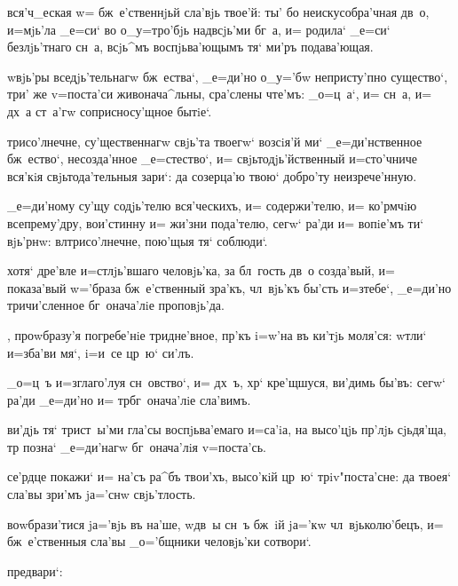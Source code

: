 {  вся'ч_еская w= 
бж~е'ственнjьй сла'вjь твое'й: ты' бо неискусобра'чная 
дв~о, и=мjь'ла _е=си` во о_у=тро'бjь над\ъ всjь'ми бг~а, 
и= родила` _е=си` безлjь'тнаго сн~а, всjь^мъ 
воспjьва'ющымъ тя` ми'ръ подава'ющая.

 w\т вjь'ры вседjь'тельнагw бж~ества`, 
_е=ди'но о_у='бw непристу'пно существо`, три' же 
v=поста'си живонача^льны, сра'слены чте'мъ: _о=ц~а`, и= 
сн~а, и= дх~а ст~а'гw соприсносу'щное бытiе`.

 трисо'лнечне, су'щественнагw свjь'та 
твоегw` возсiя'й ми` _е=ди'нственное бж~ество`, 
несозда'нное _е=стество`, и= свjьтодjь'йственный 
и=сто'чниче вся'кiя свjьтода'тельныя зари`: да созерца'ю 
твою` добро'ту неизрече'нную.

  _е=ди'ному су'щу содjь'телю 
вся'ческихъ, и= содержи'телю, и= ко'рмчiю всепрему'дру, 
вои'стинну и= жи'зни пода'телю, сегw` ра'ди и= вопiе'мъ 
ти` вjь'рнw: вл трисо'лнечне, пою'щыя тя` соблюди`.

  хотя` дре'вле 
и=стлjь'вшаго человjь'ка, за бл~гость дв~о созда'вый, и= 
показа'вый w='браза бж~е'ственный зра'къ, чл~вjь'къ 
бы'сть и=з\ъ тебе`, _е=ди'но тричи'сленное бг~онача'лiе 
проповjь'да.


 , проwбразу'я погребе'нiе 
тридне'вное, пр'къ i=w'на въ ки'тjь моля'ся: w\т тли` 
и=зба'ви мя`, i=и~се цр~ю` си'лъ.

 _о=ц~ъ и=зглаго'луя сн~овство`, и= дх~ъ, 
хр` кре'щшуся, ви'димь бы'въ: сегw` ра'ди _е=ди'но и= 
тр бг~онача'лiе сла'вимъ.

 ви'дjь тя` трист~ы'ми гла'сы воспjьва'емаго 
и=са'iа, на высо'цjь пр'лjь сjьдя'ща, тр 
позна` _е=ди'нагw бг~онача'лiя v=поста'сь.

  се'рдце покажи` и= на'съ ра^бъ 
твои'хъ, высо'кiй цр~ю` трiv"поста'сне: да твоея` сла'вы 
зри'мъ jа='снw свjь'тлость.

  воwбрази'тися jа='вjь въ 
на'ше, w\т дв~ы сн~ъ бж~iй jа='кw чл~вjьколю'бецъ, и= 
бж~е'ственныя сла'вы _о='бщники человjь'ки сотвори`.

  
предвари`:

}
